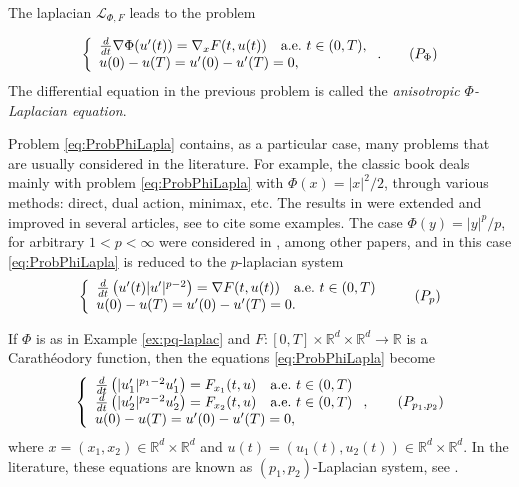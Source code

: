 \documentclass[twoside]{article}
\theoremstyle{remark}
\newcommand{\rr}{\mathbb{R}}
\newcounter{example}[section]
\begin{document}
The laplacian $\mathcal{L}_{\Phi,F}$ leads to the problem

\begin{equation}\label{eq:ProbPhiLapla}
    \left\{%
\begin{array}{ll}
  \frac{d}{dt} \nabla \Phi(u'(t))= \nabla_{x}F(t,u(t)) \quad \hbox{a.e.}\ t \in (0,T),\\
    u(0)-u(T)=u'(0)-u'(T)=0,
\end{array}%
\right. .\tag{${P_{\Phi}}$}
\end{equation}
The differential equation in the previous problem is called the \emph{anisotropic $\Phi$-Laplacian equation}.

Problem \eqref{eq:ProbPhiLapla} contains, as a particular case, many problems that are usually considered in the literature.  For example, the classic book  \cite{mawhin2010critical} deals mainly with problem \eqref{eq:ProbPhiLapla} with $\Phi(x)=|x|^2/2$, through various methods: direct, dual action, minimax, etc. The results in \cite{mawhin2010critical} were extended and improved in several articles,  see  \cite{tang1995periodic,tang1998periodic,wu1999periodic,tang2001periodic,zhao2004periodic}  to cite some examples. The case $\Phi(y)=|y|^p/p$, for arbitrary $1<p<\infty$ were considered in  \cite{Tian2007192,tang2010periodic}, among other papers, and in this case \eqref{eq:ProbPhiLapla} is reduced to the $p$-laplacian system
\begin{equation}\label{ProbP-lapla}
    \left\{%
\begin{array}{ll}
   \frac{d}{dt}\left(u'(t)|u'|^{p-2}\right) = \nabla F(t,u(t)) \quad \hbox{a.e.}\ t \in (0,T)\\
    u(0)-u(T)=u'(0)-u'(T)=0.
\end{array}%
\right.\tag{${P_p}$}
\end{equation}


If $\Phi$ is as in Example \ref{ex:pq-laplac} and  $F:[0,T]\times\rr^d\times\rr^d\to\rr$ is a Carath\'eodory function, then the equations \eqref{eq:ProbPhiLapla} become
\begin{equation}\label{eq:sist-p_lapa}
    \left\{%
\begin{array}{ll}
  \frac{d}{dt}\left(|u_1'|^{p_1-2}u_1'\right)=F_{x_1}(t,u) \quad \hbox{a.e.}\ t \in (0,T)\\
  \frac{d}{dt}\left(|u_2'|^{p_2-2}u_2'\right)=F_{x_2}(t,u) \quad \hbox{a.e.}\ t \in (0,T)\\
   u(0)-u(T)=u'(0)-u'(T)=0,
\end{array}%
\right., \tag{${P_{p_1,p_2}}$}
\end{equation}
where $x=(x_1,x_2)\in\rr^d\times\rr^d$ and $u(t)=(u_1(t),u_2(t))\in\rr^d\times\rr^d$. In the literature, these equations are known as $(p_1,p_2)$-Laplacian system, see
\cite{yang2013existence,pasca2016periodic,yang2012periodic,pasca2010periodic,pacsca2010some,pasca2011some,li2014periodic}.
\end{document}
